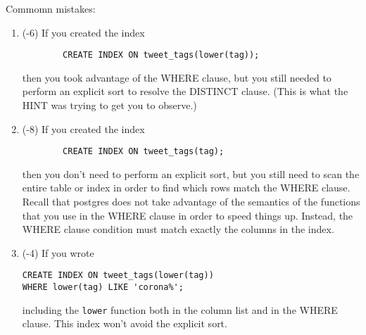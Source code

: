 \documentclass[12pt]{exam}
\theoremstyle{definition}
\begin{document}
\begin{questions}
\begin{solution}
Commomn mistakes:

\begin{enumerate}
    \item (-6)
        If you created the index
        \begin{lstlisting}
        CREATE INDEX ON tweet_tags(lower(tag));
        \end{lstlisting}
        then you took advantage of the WHERE clause, but you still needed to perform an explicit sort to resolve the DISTINCT clause.
        (This is what the HINT was trying to get you to observe.)

    \item (-8)
        If you created the index
        \begin{lstlisting}
        CREATE INDEX ON tweet_tags(tag);
        \end{lstlisting}
        then you don't need to perform an explicit sort,
        but you still need to scan the entire table or index in order to find which rows match the WHERE clause.
        Recall that postgres does not take advantage of the semantics of the functions that you use in the WHERE clause in order to speed things up.
        Instead, the WHERE clause condition must match exactly the columns in the index.

    \item (-4)
        If you wrote
\begin{lstlisting}
CREATE INDEX ON tweet_tags(lower(tag))
WHERE lower(tag) LIKE 'corona%';
\end{lstlisting}
        including the \lstinline{lower} function both in the column list and in the WHERE clause.
        This index won't avoid the explicit sort.

\end{enumerate}
\end{solution}

\newpage
{}
\end{questions}
\end{document}
